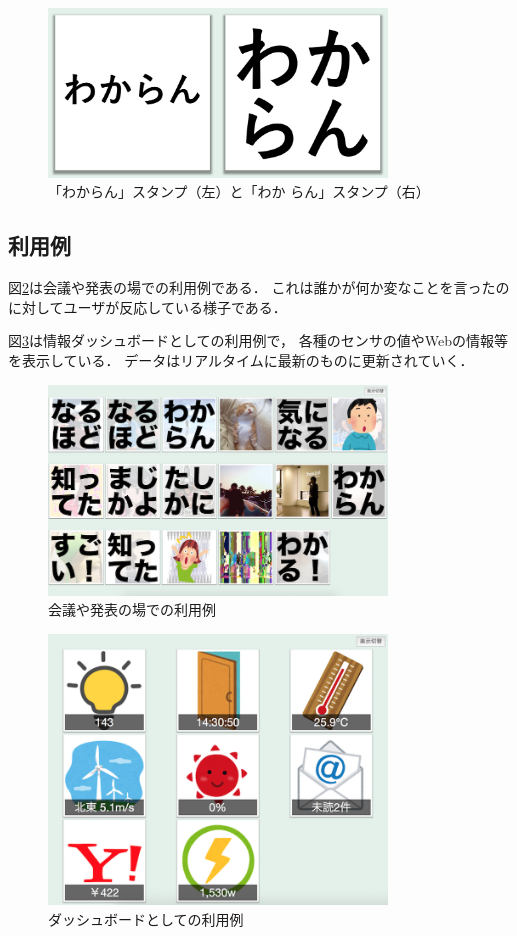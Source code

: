 \begin{figure}[H]
\centering
\includegraphics[width=9cm]{images/wakaran.png}
\caption{「わからん」スタンプ（左）と「わか らん」スタンプ（右）}
\label{wakaran}
\end{figure}


\subsection{利用例}
図\ref{discussion}は会議や発表の場での利用例である．
これは誰かが何か変なことを言ったのに対してユーザが反応している様子である．

図\ref{sensors}は情報ダッシュボードとしての利用例で，
各種のセンサの値やWebの情報等を表示している．
データはリアルタイムに最新のものに更新されていく．

\begin{figure}[H]
\centering
\includegraphics[width=9cm]{images/discussion.png}
\caption{会議や発表の場での利用例}
\label{discussion}
\end{figure}

\begin{figure}[H]
\centering
\includegraphics[width=9cm]{images/sensors.png}
\caption{ダッシュボードとしての利用例}
\label{sensors}
\end{figure}

